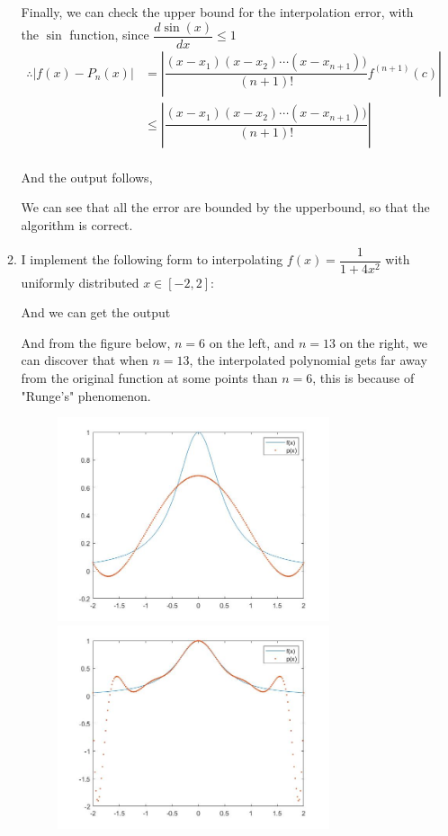 \documentclass{article}
\begin{document}
\begin{enumerate}
\begin{enumerate}
  Finally, we can check the upper bound for the interpolation  error, with the $\sin$ function, since $\dfrac{d\sin(x)}{dx}\leq 1$ \begin{align*}
  \therefore |f(x) - P_n(x)| &= \left|\dfrac{(x-x_1)(x-x_2)\cdots(x-x_{n+1}))}{(n+1)!}f^{(n+1)}(c)\right|\\
  &\leq  \left|\dfrac{(x-x_1)(x-x_2)\cdots(x-x_{n+1}))}{(n+1)!}\right|\\
  \end{align*}
  
  And the output follows,
    
    We can see that all the error are bounded by the upperbound, so that the algorithm is correct.
    \item
  I implement the following form to interpolating $f(x) = \dfrac{1}{1+4x^2}$ with uniformly distributed $x \in [-2,2]$:
   
   And we can get the output
     
     And from the figure below, $n=6$ on the left, and $n = 13$ on the right, we can discover that when $n=13$, the interpolated polynomial gets far away from the original function at some points than $n=6$, this is because of "Runge's" phenomenon.
\begin{figure}[ht]
\centering
        \includegraphics[width=8cm]{uniform6.jpg}
        \includegraphics[width=8cm]{uniform13.jpg}  
  \end{figure}
  

\end{enumerate}
\end{enumerate}
\end{document}
